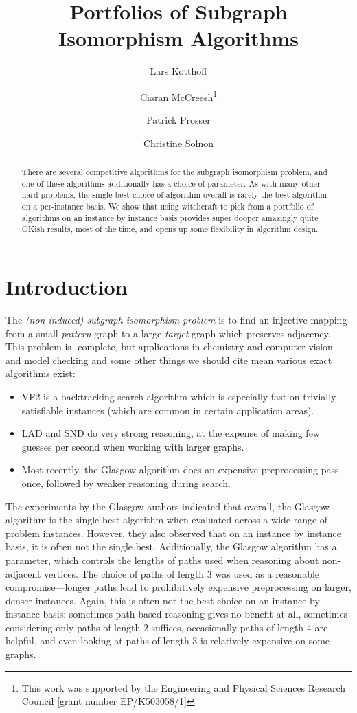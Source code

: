 \documentclass{llncs}
\title{Portfolios of Subgraph Isomorphism Algorithms}
\author{
    Lars Kotthoff\inst{1}
    \and Ciaran McCreesh\thanks{This work was supported by the Engineering
        and Physical Sciences Research Council [grant number EP/K503058/1]}\inst{2}
    \and Patrick Prosser\inst{2}
    \and Christine Solnon\inst{3}}
\institute{
    University of British Columbia, Vancouver, Canada
    \and University of Glasgow, Glasgow, Scotland
    \and INSA-Lyon, LIRIS, UMR5205, F-69621, France}
\begin{document}
\maketitle

\begin{abstract}
There are several competitive algorithms for the subgraph isomorphism problem, and one of these
algorithms additionally has a choice of parameter. As with many other hard problems, the single best
choice of algorithm overall is rarely the best algorithm on a per-instance basis. We show that using
witchcraft to pick from a portfolio of algorithms on an instance by instance basis provides super
dooper amazingly quite OKish results, most of the time, and opens up some flexibility in algorithm
design.
\end{abstract}

\section{Introduction}

The \emph{(non-induced) subgraph isomorphism problem} is to find an injective mapping from a small
\emph{pattern} graph to a large \emph{target} graph which preserves adjacency. This problem is
\NP-complete, but applications in chemistry and computer vision and model checking and some other
things we should cite mean various exact algorithms exist:

\begin{itemize}
    \item VF2 \cite{Cordella:2004} is a backtracking search algorithm which is especially fast on
        trivially satisfiable instances (which are common in certain application areas).
    \item LAD \cite{Solnon:2010} and SND \cite{Audemard:2014} do very strong reasoning, at the
        expense of making few guesses per second when working with larger graphs.
    \item Most recently, the Glasgow algorithm \cite{McCreesh:2015} does an expensive preprocessing
        pass once, followed by weaker reasoning during search.
\end{itemize}

\noindent The experiments by the Glasgow authors indicated that overall, the Glasgow algorithm is
the single best algorithm when evaluated across a wide range of problem instances. However, they
also observed that on an instance by instance basis, it is often not the single best.  Additionally,
the Glasgow algorithm has a parameter, which controls the lengths of paths used when reasoning about
non-adjacent vertices.  The choice of paths of length 3 was used as a reasonable compromise---longer
paths lead to prohibitively expensive preprocessing on larger, denser instances. Again, this is
often not the best choice on an instance by instance basis: sometimes path-based reasoning gives no
benefit at all, sometimes considering only paths of length 2 suffices, occasionally paths of
length 4 are helpful, and even looking at paths of length 3 is relatively expensive on some graphs.
\end{document}
